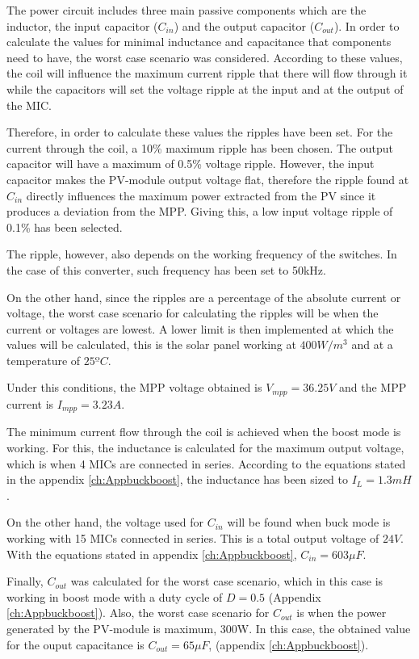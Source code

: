 The power circuit includes three main passive components which are the inductor, the input capacitor ($C_{in}$) and the output capacitor ($C_{out}$). In order to calculate the values for minimal inductance and capacitance that components need to have, the worst case scenario was considered. According to these values, the coil will influence the maximum current ripple that there will flow through it while the capacitors will set the voltage ripple at the input and at the output of the MIC. 

Therefore, in order to calculate these values the ripples have been set. For the current through the coil, a 10\% maximum ripple has been chosen. The output capacitor will  have a maximum of 0.5\% voltage ripple. However, the input capacitor makes the PV-module output voltage flat, therefore the ripple found at $C_{in}$ directly influences the maximum power extracted from the PV since it produces a deviation from the MPP. Giving this, a low input voltage ripple of 0.1\% has been selected.

The ripple, however, also depends on the working frequency of the switches. In the case of this converter, such frequency has been set to 50kHz. 

On the other hand, since the ripples are a percentage of the absolute current or voltage, the worst case scenario for calculating the ripples will be when the current or voltages are lowest. A lower limit is then implemented at which the values will be calculated, this is the solar panel working at $400 W/m^3$ and at a temperature of $25 ºC$.

Under this conditions, the MPP voltage obtained is $V_{mpp} = 36.25V$ and the MPP current is $I_{mpp} = 3.23A$.

The minimum current flow through the coil is achieved when the boost mode is working. For this, the inductance is calculated for the maximum output voltage, which is when 4 MICs are connected in series. According to the equations stated in the appendix \ref{ch:Appbuckboost}, the inductance has been sized to $I_{L} = 1.3mH$.

On the other hand, the voltage used for $C_{in}$ will be found when buck mode is working with 15 MICs connected in series. This is a total output voltage of $24 V$. 
With the equations stated in appendix \ref{ch:Appbuckboost}, $C_{in} = 603 \mu F$.

Finally, $C_{out}$ was calculated for the worst case scenario, which in this case is working in boost mode with a duty cycle of $D = 0.5$ (Appendix \ref{ch:Appbuckboost}). Also, the worst case scenario for $C_{out}$ is when the power generated by the PV-module is maximum, 300W.
In this case, the obtained value for the ouput capacitance is $C_{out} = 65 \mu F$, (appendix \ref{ch:Appbuckboost}).
   
